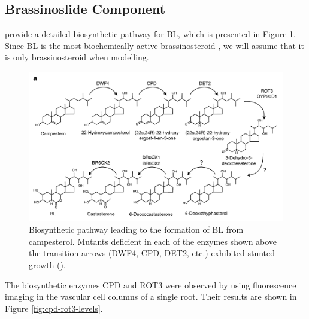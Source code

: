 \subsection{Brassinoslide Component}

\cite{vukasinovic2021} provide a detailed biosynthetic pathway for BL, which is presented in Figure \ref{fig:biosynthetic-pathway}. Since BL is the most biochemically active brassinosteroid \cite{vanesse2012}, we will assume that it is only brassinosteroid when modelling. 

\begin{figure}[!htbp]
    \centering
    \includegraphics[width=13cm]{img/brassinosteroid-precursors.png}
    \caption{Biosynthetic pathway leading to the formation of BL from campesterol. Mutants deficient in each of the enzymes shown above the transition arrows (DWF4, CPD, DET2, etc.) exhibited stunted growth (\cite{vukasinovic2021}).}
    \label{fig:biosynthetic-pathway}
\end{figure}

\medskip

The biosynthetic enzymes CPD and ROT3 were observed by \cite{vukasinovic2021} using fluorescence imaging in the vascular cell columns of a single root. Their results are shown in Figure \ref{fig:cpd-rot3-levels}.

